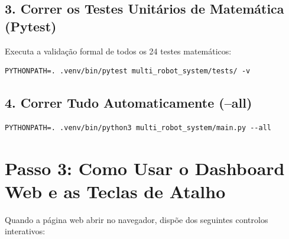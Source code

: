 \documentclass[11pt,a4paper]{article}
\begin{document}
\subsection{3. Correr os Testes Unitários de Matemática (Pytest)}
Executa a validação formal de todos os 24 testes matemáticos:
\begin{lstlisting}
PYTHONPATH=. .venv/bin/pytest multi_robot_system/tests/ -v
\end{lstlisting}

\subsection{4. Correr Tudo Automaticamente (--all)}
\begin{lstlisting}
PYTHONPATH=. .venv/bin/python3 multi_robot_system/main.py --all
\end{lstlisting}

\section{Passo 3: Como Usar o Dashboard Web e as Teclas de Atalho}

Quando a página web abrir no navegador, dispõe dos seguintes controlos interativos:
\end{document}
